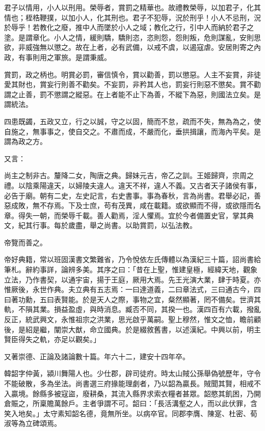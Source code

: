\begin{pinyinscope}
君子以情用，小人以刑用。榮辱者，賞罰之精華也。故禮教榮辱，以加君子，化其情也；桎梏鞭撲，以加小人，化其刑也。君子不犯辱，況於刑乎！小人不忌刑，況於辱乎！若教化之廢，推中人而墜於小人之域；教化之行，引中人而納於君子之塗。是謂章化。小人之情，緩則驕，驕則恣，恣則怨，怨則叛，危則謀亂，安則思欲，非威強無以懲之。故在上者，必有武備，以戒不虞，以遏寇虐。安居則寄之內政，有事則用之軍旅。是謂秉威。

賞罰，政之柄也。明賞必罰，審信慎令，賞以勸善，罰以懲惡。人主不妄賞，非徒愛其財也，賞妄行則善不勸矣。不妄罰，非矜其人也，罰妄行則惡不懲矣。賞不勸謂之止善，罰不懲謂之縱惡。在上者能不止下為善，不縱下為惡，則國法立矣。是謂統法。

四患既蠲，五政又立，行之以誠，守之以固，簡而不怠，疏而不失，無為為之，使自施之，無事事之，使自交之。不肅而成，不嚴而化，垂拱揖讓，而海內平矣。是謂為政之方。

又言：

尚主之制非古。釐降二女，陶唐之典。歸妹元吉，帝乙之訓。王姬歸齊，宗周之禮。以陰乘陽違天，以婦陵夫違人。違天不祥，違人不義。又古者天子諸侯有事，必告于廟。朝有二史，左史記言，右史書事。事為春秋，言為尚書。君舉必記，善惡成敗，無不存焉。下及士庶，苟有茂異，咸在載籍。或欲顯而不得，或欲隱而名章。得失一朝，而榮辱千載。善人勸焉，淫人懼焉。宜於今者備置史官，掌其典文，紀其行事。每於歲盡，舉之尚書。以助賞罰，以弘法教。

帝覽而善之。

帝好典籍，常以班固漢書文繁難省，乃令悅依左氏傳體以為漢紀三十篇，詔尚書給筆札。辭約事詳，論辨多美。其序之曰：「昔在上聖，惟建皇極，經緯天地，觀象立法，乃作書契，以通宇宙，揚于王庭，厥用大焉。先王光演大業，肆于時夏。亦惟厥後，永世作典。夫立典有五志焉：一曰達道義，二曰章法式，三曰通古今，四曰著功勳，五曰表賢能。於是天人之際，事物之宜，粲然顯著，罔不備矣。世濟其軌，不隕其業。損益盈虛，與時消息。臧否不同，其揆一也。漢四百有六載，撥亂反正，統武興文，永惟祖宗之洪業，思光啟乎萬嗣。聖上穆然，惟文之恤，瞻前顧後，是紹是繼，闡崇大猷，命立國典。於是綴敘舊書，以述漢紀。中興以前，明主賢臣得失之軌，亦足以觀矣。」

又著崇德、正論及諸論數十篇。年六十二，建安十四年卒。

韓韶字仲黃，潁川舞陽人也。少仕郡，辟司徒府。時太山賊公孫舉偽號歷年，守令不能破散，多為坐法。尚書選三府掾能理劇者，乃以韶為贏長。賊聞其賢，相戒不入贏境。餘縣多被寇盜，廢耕桑，其流入縣界求索衣糧者甚眾。韶愍其飢困，乃開倉賑之，所稟贍萬餘戶。主者爭謂不可。韶曰：「長活溝壑之人，而以此伏罪，含笑入地矣。」太守素知韶名德，竟無所坐。以病卒官。同郡李膺、陳寔、杜密、荀淑等為立碑頌焉。


\end{pinyinscope}
